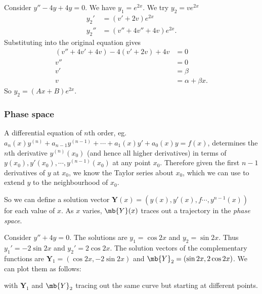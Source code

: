 \documentclass[a4paper]{article}
\begin{document}
  \begin{eg}
    Consider $y'' - 4y + 4y = 0$. We have $y_1 = e^{2x}$. We try $y_2 = ve^{2x}$
    \begin{align*}
      y_2' &= (v' + 2v)e^{2x}\\
      y_2'' &= (v'' + 4v'' + 4v)e^{2x}.
    \end{align*}
    Substituting into the original equation gives
    \begin{align*}
      (v'' + 4v' + 4v) - 4(v' + 2v) + 4v &= 0\\
      v'' &= 0\\
      v' &= \beta\\
      v &= \alpha + \beta x.
    \end{align*}
    So $y_2 = (Ax + B)e^{2x}$.
  \end{eg}

  \subsubsection{Phase space}
  A differential equation of $n$th order, eg. $a_n(x) y^{(n)} + a_{n - 1}y^{(n - 1)} + \cdots + a_1(x) y' + a_0 (x) y = f(x)$, determines the $n$th derivative $y^{(n)} (x_0)$ (and hence all higher derivatives) in terms of $y(x_0), y'(x_0), \cdots ,y^{(n - 1)}(x_0)$ at any point $x_0$. Therefore given the first $n - 1$ derivatives of $y$ at $x_0$, we know the Taylor series about $x_0$, which we can use to extend $y$ to the neighbourhood of $x_0$.

  So we can define a solution vector $\mathbf{Y}(x) = (y(x), y'(x),f \cdots , y^{n - 1}(x))$ for each value of $x$. As $x$ varies, $\mb{Y}(x)$ traces out a trajectory in the \emph{phase space}.

  \begin{eg}
    Consider $y'' + 4y = 0$. The solutions are $y_1 = \cos 2x$ and $y_2 = \sin 2x$. Thus $y_1' = -2\sin 2x$ and $y_2' = 2\cos 2x$. The solution vectors of the complementary functions are $\mathbf{Y}_1 = (\cos 2x, -2\sin 2x)$ and $\mb{Y}_2 = (\sin 2x, 2\cos 2x)$. We can plot them as follows:

    \begin{center}
    \end{center}

    \noindent with $\mathbf{Y}_1$ and $\mb{Y}_2$ tracing out the same curve but starting at different points.
  \end{eg}
\end{document}
